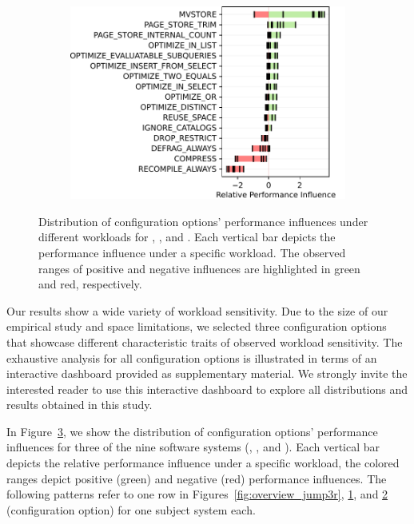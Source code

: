 {{{\begin{figure}
\begin{subfigure}{0.29\linewidth}
		\caption{\zdrei}
		\label{fig:overview_z3}
	\end{subfigure}
	\begin{subfigure}{0.4\linewidth}
		\centering
		\includegraphics[width=\linewidth]{images/h2.pdf}
		\caption{\htwo}
		\label{fig:overview_h2}
	\end{subfigure}
	
	\caption{Distribution of configuration options' performance influences under different workloads for \jumper, \zdrei, and \htwo. Each vertical bar depicts the performance influence under a specific workload. The observed ranges of positive and negative influences are highlighted in green and red, respectively.}
	\label{fig:three_systems}
\end{figure}
	
Our results show a wide variety of workload sensitivity. Due to the size of our empirical study and space limitations, we selected three configuration options that showcase different characteristic traits of observed workload sensitivity. The exhaustive analysis for all configuration options is illustrated in terms of an interactive dashboard provided as supplementary material. We strongly invite the interested reader to use this interactive dashboard to explore all distributions and results obtained in this study.

{In Figure~\ref{fig:three_systems}, we show the distribution of configuration options' performance influences for three of the nine software systems (\jumper, \zdrei, and \htwo). {\color{black}Each vertical bar depicts the relative performance influence under a specific workload, the colored ranges depict positive (green) and negative (red) performance influences. The following patterns refer to one row in Figures~\ref{fig:overview_jump3r}, \ref{fig:overview_z3}, and \ref{fig:overview_h2} (configuration option) for one subject system each.}

}}}}
